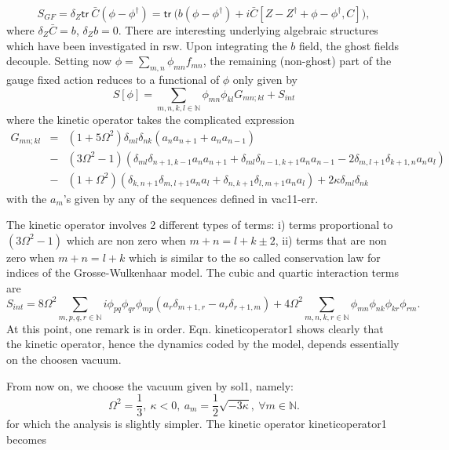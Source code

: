 \documentclass[10pt]{book}
\newcommand{\tr}{\mathsf{tr}}
\theoremstyle{break}
\begin{document}
\begin{equation}
S_{GF}=\delta_Z\tr\ {\bar{C}}(\phi-\phi^\dag)=\tr\ \bigg( b(\phi-\phi^\dag)+i{\bar{C}}[Z-Z^\dag+\phi-\phi^\dag,C]\bigg),
\end{equation}
where $\delta_Z{\bar{C}}=b$, $\delta_Zb=0$. There are interesting underlying algebraic structures which have been investigated in {rsw}. Upon integrating the $b$ field, the ghost fields decouple. Setting now $\phi=\sum_{m,n}\phi_{mn}f_{mn}$, the remaining (non-ghost) part of the gauge fixed action reduces to a functional of $\phi$ only given by
\begin{equation}
S[\phi]=\sum_{m,n,k,l\in\mathbb{N}} \phi_{mn}\phi_{kl}G_{mn;kl}+S_{int}
\end{equation}
where the kinetic operator takes the complicated expression
\begin{eqnarray}
G_{mn;kl} &=&(1+5\Omega^2)\delta_{ml}\delta_{nk}(a_na_{n+1}+a_na_{n-1})\nonumber\\
&-&(3\Omega^2-1)(\delta_{ml}\delta_{n+1,k-1}a_na_{n+1}+\delta_{ml}\delta_{n-1,k+1}a_na_{n-1}
-2\delta_{m,l+1}\delta_{k+1,n}a_na_l)\nonumber \\
&-&(1+\Omega^2)(\delta_{k,n+1}\delta_{m,l+1}a_na_l+\delta_{n,k+1}\delta_{l,m+1}a_na_l)+2\kappa\delta_{ml}\delta_{nk}
\end{eqnarray}
with the $a_m$'s given by any of the sequences defined in {vac11}-{err}. \par
The kinetic operator involves 2 different types of terms: i) terms proportional to $(3\Omega^2-1)$ which are non zero when $m+n=l+k\pm2$, ii) terms that are non zero when $m+n=l+k$ which is similar to the so called conservation law for indices of the Grosse-Wulkenhaar model. The cubic and quartic interaction terms are
\begin{equation}
S_{int}=8\Omega^2\sum_{m,p,q,r\in\mathbb{N}}i\phi_{pq}\phi_{qr}\phi_{mp}(a_r\delta_{m+1,r}-a_r\delta_{r+1,m})+
4\Omega^2\sum_{m,n,k,r\in\mathbb{N}}\phi_{mn}\phi_{nk}\phi_{kr}\phi_{rm}.
\end{equation}
At this point, one remark is in order. Eqn. {kineticoperator1} shows clearly that the kinetic operator, hence the dynamics coded by the model, depends essentially on the choosen vacuum.\par
From now on, we choose the vacuum given by {sol1}, namely: 
\begin{equation}
\Omega^2={\frac{1}{3}},\ \kappa<0,\ a_m={\frac12}{\sqrt{ -3\kappa}},\ \forall m\in\mathbb{N}\nonumber.
\end{equation}
for which the analysis is slightly simpler. The kinetic operator {kineticoperator1} becomes
\end{document}
